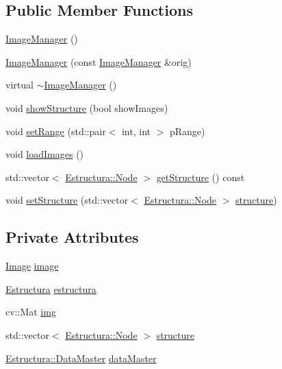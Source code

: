 \subsection*{Public Member Functions}
\begin{DoxyCompactItemize}
\item 
\hyperlink{classImageManager_a8c856af0e3f0d23da7c765b0e33e585e}{Image\+Manager} ()
\item 
\hyperlink{classImageManager_a73c9c0419074956609f94dab2aacc183}{Image\+Manager} (const \hyperlink{classImageManager}{Image\+Manager} \&orig)
\item 
virtual \hyperlink{classImageManager_a3cad118fdf026d379641fb6b52cd1884}{$\sim$\+Image\+Manager} ()
\item 
void \hyperlink{classImageManager_a8b13aa8049b1294220d58b1c4749de9b}{show\+Structure} (bool show\+Images)
\item 
void \hyperlink{classImageManager_a21627e8230428f3a4bf7ec99703448e6}{set\+Range} (std\+::pair$<$ int, int $>$ p\+Range)
\item 
void \hyperlink{classImageManager_abbec13f7f949d5ea3b34fb52bd812e68}{load\+Images} ()
\item 
std\+::vector$<$ \hyperlink{structEstructura_1_1Node}{Estructura\+::\+Node} $>$ \hyperlink{classImageManager_adbdf00be4cb90cfb260cdc208612cd8c}{get\+Structure} () const 
\item 
void \hyperlink{classImageManager_ada142feb7f1f5e99a102ff043aacc6b7}{set\+Structure} (std\+::vector$<$ \hyperlink{structEstructura_1_1Node}{Estructura\+::\+Node} $>$ \hyperlink{classImageManager_a9a2da56c0a4aa3d4cdebdea45d81cca7}{structure})
\end{DoxyCompactItemize}
\subsection*{Private Attributes}
\begin{DoxyCompactItemize}
\item 
\hyperlink{classImage}{Image} \hyperlink{classImageManager_a8a66a77f0bb0dc06c2d3d064f9f1e27f}{image}
\item 
\hyperlink{classEstructura}{Estructura} \hyperlink{classImageManager_a9d328384bb5a1e13d0a50aefea3680cf}{estructura}
\item 
cv\+::\+Mat \hyperlink{classImageManager_ae096d2db43b8d7efe508ff68b987e992}{img}
\item 
std\+::vector$<$ \hyperlink{structEstructura_1_1Node}{Estructura\+::\+Node} $>$ \hyperlink{classImageManager_a9a2da56c0a4aa3d4cdebdea45d81cca7}{structure}
\item 
\hyperlink{structEstructura_1_1DataMaster}{Estructura\+::\+Data\+Master} \hyperlink{classImageManager_aa07e129af2fa348547c99843c0058c2b}{data\+Master}
\end{DoxyCompactItemize}


